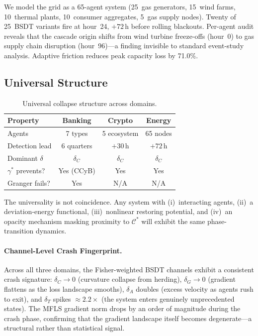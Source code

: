 \documentclass[final]{siamltex}
\newcommand{\Cman}{\mathcal{C}^*}
\begin{document}
We model the grid as a 65-agent system (25~gas generators, 15~wind
farms, 10~thermal plants, 10~consumer aggregates, 5~gas supply
nodes). Twenty of 25~BSDT variants fire at hour~24, $+72$\,h before
rolling blackouts. Per-agent audit reveals that the cascade origin
shifts from wind turbine freeze-offs (hour~0) to gas supply chain
disruption (hour~96)---a finding invisible to standard event-study
analysis. Adaptive friction reduces peak capacity loss by 71.0\%.

\subsection{Universal Structure}

\begin{table}[htbp]
\centering
\caption{Universal collapse structure across domains.}
\label{tab:universal}
\begin{tabular}{@{}lccc@{}}
\toprule
Property & Banking & Crypto & Energy\\
\midrule
Agents & 7 types & 5 ecosystem & 65 nodes\\
Detection lead & 6 quarters & $+30$\,h & $+72$\,h\\
Dominant $\delta$ & $\delta_C$ & $\delta_C$ & $\delta_C$\\
$\gamma^*$ prevents? & Yes (CCyB) & Yes & Yes\\
Granger fails? & Yes & N/A & N/A\\
\bottomrule
\end{tabular}
\end{table}

The universality is not coincidence. Any system with (i)~interacting
agents, (ii)~a deviation-energy functional, (iii)~nonlinear
restoring potential, and (iv)~an opacity mechanism masking proximity
to $\Cman$ will exhibit the same phase-transition dynamics.

\paragraph{Channel-Level Crash Fingerprint.}
Across all three domains, the Fisher-weighted BSDT channels exhibit
a consistent crash signature: $\delta_C \to 0$ (curvature collapse
from herding), $\delta_G \to 0$ (gradient flattens as the loss
landscape smooths), $\delta_A$ doubles (excess velocity as agents
rush to exit), and $\delta_T$ spikes $\approx 2.2\times$ (the
system enters genuinely unprecedented states).  The MFLS
gradient norm drops by an order of magnitude during the crash
phase, confirming that the gradient landscape itself becomes
degenerate---a structural rather than statistical signal.
\end{document}
